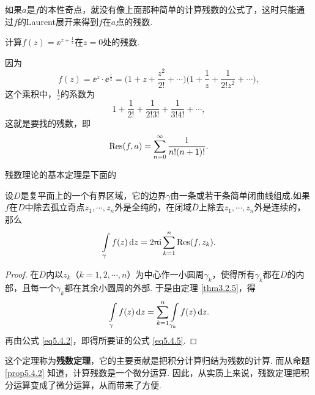 如果$a$是$f$的本性奇点，就没有像上面那种简单的计算残数的公式了，这时只能通过$f$的Laurent展开来得到$f$在$a$点的残数.

\begin{example}\label{exam5.4.8}
计算$f(z)=\ee^{z+\frac1z}$在$z=0$处的残数.
\end{example}
\begin{solution}
因为
\[f(z)=\ee^z\cdot\ee^{\frac1z}=
\bigg(1+z+\frac{z^2}{2!}+\cdots\bigg)\bigg(1+\frac1z+\frac1{2!z^2}+\cdots\bigg),\]
这个乘积中，$\frac1z$的系数为
\[1+\frac1{2!}+\frac1{2!3!}+\frac1{3!4!}+\cdots,\]
这就是要找的残数，即
\begin{equation*}
\operatorname*{Res}(f,a)=\sum_{n=0}^\infty\frac1{n!(n+1)!}.
\end{equation*}
\end{solution}

残数理论的基本定理是下面的
\begin{theorem}\label{thm5.4.9}
设$D$是复平面上的一个有界区域，它的边界$\gamma$由一条或若干条简单闭曲线组成.如果$f$在$D$中除去孤立奇点$z_1,\cdots,z_n$外是全纯的，在闭域$\bar D$上除去$z_1,\cdots,z_n$外是连续的，那么
\begin{equation}\label{eq5.4.5}
\int\limits_\gamma f(z)\mathop{}\!\mathrm dz=2\uppi\mathrm i\sum_{k=1}^n\operatorname*{Res}(f,z_k).
\end{equation}
\end{theorem}
\begin{proof}
在$D$内以$z_k$（$k=1,2,\cdots,n$）为中心作一小圆周$\gamma_k$，使得所有$\gamma_k$都在$D$的内部，且每一个$\gamma_k$都在其余小圆周的外部. 于是由定理 \ref{thm3.2.5}，得
\[\int\limits_\gamma f(z)\mathop{}\!\mathrm dz=\sum_{k=1}^n\int\limits_{\gamma_k}f(z)\mathop{}\!\mathrm dz.\]
再由公式 \eqref{eq5.4.2}，即得所要证的公式 \eqref{eq5.4.5}.
\end{proof}

这个定理称为\textbf{残数定理}，它的主要贡献是把积分计算归结为残数的计算. 而从命题 \ref{prop5.4.2} 知道，计算残数是一个微分运算. 因此，从实质上来说，残数定理把积分运算变成了微分运算，从而带来了方便.

